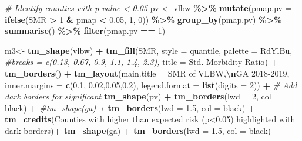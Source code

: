 \documentclass[
]{book}
\newenvironment{Shaded}{\begin{snugshade}}{\end{snugshade}}
\newcommand{\AttributeTok}[1]{\textcolor[rgb]{0.13,0.29,0.53}{#1}}
\newcommand{\CommentTok}[1]{\textcolor[rgb]{0.56,0.35,0.01}{\textit{#1}}}
\newcommand{\DecValTok}[1]{\textcolor[rgb]{0.00,0.00,0.81}{#1}}
\newcommand{\FloatTok}[1]{\textcolor[rgb]{0.00,0.00,0.81}{#1}}
\newcommand{\FunctionTok}[1]{\textcolor[rgb]{0.13,0.29,0.53}{\textbf{#1}}}
\newcommand{\NormalTok}[1]{#1}
\newcommand{\OtherTok}[1]{\textcolor[rgb]{0.56,0.35,0.01}{#1}}
\newcommand{\SpecialCharTok}[1]{\textcolor[rgb]{0.81,0.36,0.00}{\textbf{#1}}}
\newcommand{\StringTok}[1]{\textcolor[rgb]{0.31,0.60,0.02}{#1}}
\begin{document}
\begin{Shaded}
\begin{Highlighting}[]
\CommentTok{\# Identify counties with p{-}value \textless{} 0.05}
\NormalTok{pv }\OtherTok{\textless{}{-}}\NormalTok{ vlbw }\SpecialCharTok{\%\textgreater{}\%}
  \FunctionTok{mutate}\NormalTok{(}\AttributeTok{pmap.pv =} \FunctionTok{ifelse}\NormalTok{(SMR }\SpecialCharTok{\textgreater{}} \DecValTok{1} \SpecialCharTok{\&}\NormalTok{ pmap }\SpecialCharTok{\textless{}} \FloatTok{0.05}\NormalTok{, }\DecValTok{1}\NormalTok{, }\DecValTok{0}\NormalTok{)) }\SpecialCharTok{\%\textgreater{}\%}
  \FunctionTok{group\_by}\NormalTok{(pmap.pv) }\SpecialCharTok{\%\textgreater{}\%}
  \FunctionTok{summarise}\NormalTok{() }\SpecialCharTok{\%\textgreater{}\%}
  \FunctionTok{filter}\NormalTok{(pmap.pv }\SpecialCharTok{==} \DecValTok{1}\NormalTok{)}


\NormalTok{m3}\OtherTok{\textless{}{-}} \FunctionTok{tm\_shape}\NormalTok{(vlbw) }\SpecialCharTok{+}
  \FunctionTok{tm\_fill}\NormalTok{(}\StringTok{\textquotesingle{}SMR\textquotesingle{}}\NormalTok{,}
          \AttributeTok{style =} \StringTok{\textquotesingle{}quantile\textquotesingle{}}\NormalTok{,}
          \AttributeTok{palette =} \StringTok{\textquotesingle{}{-}RdYlBu\textquotesingle{}}\NormalTok{,}
          \CommentTok{\#breaks = c(0.13, 0.67, 0.9, 1.1, 1.4, 2.3),}
          \AttributeTok{title =} \StringTok{\textquotesingle{}Std. Morbidity Ratio\textquotesingle{}}\NormalTok{) }\SpecialCharTok{+} 
  \FunctionTok{tm\_borders}\NormalTok{() }\SpecialCharTok{+}
  \FunctionTok{tm\_layout}\NormalTok{(}\AttributeTok{main.title =} \StringTok{\textquotesingle{}SMR of VLBW,}\SpecialCharTok{\textbackslash{}n}\StringTok{GA 2018{-}2019\textquotesingle{}}\NormalTok{,}
            \AttributeTok{inner.margins =} \FunctionTok{c}\NormalTok{(}\FloatTok{0.1}\NormalTok{, }\FloatTok{0.02}\NormalTok{,}\FloatTok{0.05}\NormalTok{,}\FloatTok{0.2}\NormalTok{),}
            \AttributeTok{legend.format =} \FunctionTok{list}\NormalTok{(}\AttributeTok{digits =} \DecValTok{2}\NormalTok{)) }\SpecialCharTok{+}
  \CommentTok{\# Add dark borders for significant}
  \FunctionTok{tm\_shape}\NormalTok{(pv) }\SpecialCharTok{+}
  \FunctionTok{tm\_borders}\NormalTok{(}\AttributeTok{lwd =} \DecValTok{2}\NormalTok{, }\AttributeTok{col =} \StringTok{\textquotesingle{}black\textquotesingle{}}\NormalTok{) }\SpecialCharTok{+}
  \CommentTok{\#tm\_shape(ga) + }
  \FunctionTok{tm\_borders}\NormalTok{(}\AttributeTok{lwd =} \FloatTok{1.5}\NormalTok{, }\AttributeTok{col =} \StringTok{\textquotesingle{}black\textquotesingle{}}\NormalTok{) }\SpecialCharTok{+}
  \FunctionTok{tm\_credits}\NormalTok{(}\StringTok{\textquotesingle{}Counties with higher than expected risk (p\textless{}0.05) highlighted with dark borders\textquotesingle{}}\NormalTok{)}\SpecialCharTok{+}
  \FunctionTok{tm\_shape}\NormalTok{(ga) }\SpecialCharTok{+}
  \FunctionTok{tm\_borders}\NormalTok{(}\AttributeTok{lwd =} \FloatTok{1.5}\NormalTok{, }\AttributeTok{col =} \StringTok{\textquotesingle{}black\textquotesingle{}}\NormalTok{)}


\end{Highlighting}
\end{Shaded}
\end{document}
